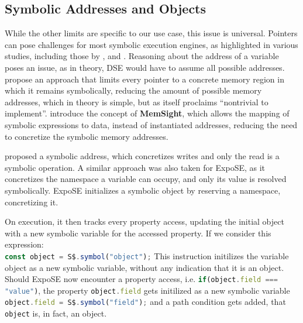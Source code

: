 \subsection{Symbolic Addresses and Objects}
\label{sec:sym-obj}
While the other limits are specific to our use case, this issue is universal. Pointers can pose challenges for most symbolic execution engines, as highlighted in various studies, including those by \citet{cha_unleashing_2012}, \citet{coppa_rethinking_2017} and \citet{elkarablieh_precise_2009}.
Reasoning about the address of a variable poses an issue, as in theory, DSE would have to assume all possible addresses. 
\citet{elkarablieh_precise_2009} propose an approach that limits every pointer to a concrete memory region in which it remains symbolically, reducing the amount of possible memory addresses, which in theory is simple, but as itself proclaims “nontrivial to implement”. 
\citet{coppa_rethinking_2017} introduce the concept of \textbf{MemSight}, which allows the mapping of symbolic expressions to data, instead of instantiated addresses, reducing the need to concretize the symbolic memory addresses. 

\citet{cha_unleashing_2012} proposed a symbolic address, which concretizes writes and only the read is a symbolic operation. 
A similar approach was also taken for ExpoSE, as it concretizes the namespace a variable can occupy, and only its value is resolved symbolically.
ExpoSE initializes a symbolic object by reserving a namespace, concretizing it.


On execution, it then tracks every property access, updating the initial object with a new symbolic variable for the accessed property. 
If we consider this expression:\\
\lstinline[language=JavaScript]{const object = S$.symbol("object");}
This instruction initilizes the variable object as a new symbolic variable, without any indication that it is an object. 
Should ExpoSE now encounter a property access, i.e.
\lstinline[language=JavaScript]{if(object.field === "value")},
the property \lstinline[language=JavaScript]{object.field} gets initilized as a new symbolic variable
\lstinline[language=JavaScript]{object.field = S$.symbol("field");} 
and a path condition gets added, that \lstinline[language=JavaScript]{object} is, in fact, an object.\cite{loring_systematic_2021}

